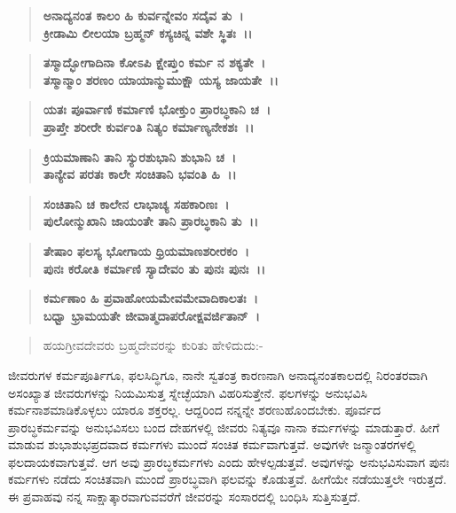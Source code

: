 \begin{verse}
\textbf{ಅನಾದ್ಯನಂತ ಕಾಲಂ ಹಿ ಕುರ್ವನ್ನೇವಂ ಸದೈವ ತು~।}\\\textbf{ಕ್ರೀಡಾಮಿ ಲೀಲಯಾ ಬ್ರಹ್ಮನ್ ಕಸ್ಯಚಿನ್ನ ವಶೇ ಸ್ಥಿತಃ~।।}
\end{verse}

\begin{verse}
\textbf{ತಸ್ಮಾದ್ಭೋಗಾದಿನಾ ಕೋಽಪಿ ಕ್ಷೇಪ್ತುಂ ಕರ್ಮ ನ ಶಕ್ಯತೇ~।}\\\textbf{ತಸ್ಮಾನ್ಮಾಂ ಶರಣಂ ಯಾಯಾನ್ಮುಮುಕ್ಷೌ ಯಸ್ಯ ಜಾಯತೇ~।।}
\end{verse}

\begin{verse}
\textbf{ಯತಃ ಪೂರ್ವಾಣಿ ಕರ್ಮಾಣಿ ಭೋಕ್ತುಂ ಪ್ರಾರಬ್ಧಕಾನಿ ಚ~।}\\\textbf{ಪ್ರಾಪ್ತೇ ಶರೀರೇ ಕುರ್ವಂತಿ ನಿತ್ಯಂ ಕರ್ಮಾಣ್ಯನೇಕಶಃ~।।}
\end{verse}

\begin{verse}
\textbf{ಕ್ರಿಯಮಾಣಾನಿ ತಾನಿ ಸ್ಯುರಶುಭಾನಿ ಶುಭಾನಿ ಚ~।}\\\textbf{ತಾನ್ಯೇವ ಪರತಃ ಕಾಲೇ ಸಂಚಿತಾನಿ ಭವಂತಿ ಹಿ~।।}
\end{verse}

\begin{verse}
\textbf{ಸಂಚಿತಾನಿ ಚ ಕಾಲೇನ ಲಾಭಾಚ್ಯ ಸಹಕಾರಿಣಃ~।}\\\textbf{ಪುಲೋನ್ಮುಖಾನಿ ಜಾಯಂತೇ ತಾನಿ ಪ್ರಾರಬ್ಧಕಾನಿ ತು~।।}
\end{verse}

\begin{verse}
\textbf{ತೇಷಾಂ ಫಲಸ್ಯ ಭೋಗಾಯ ಧ್ರಿಯಮಾಣಶರೀರಕಂ~।}\\\textbf{ಪುನಃ ಕರೋತಿ ಕರ್ಮಾಣಿ ಸ್ಯಾದೇವಂ ತು ಪುನಃ ಪುನಃ~।।}
\end{verse}

\begin{verse}
\textbf{ಕರ್ಮಣಾಂ ಹಿ ಪ್ರವಾಹೋಯಮೇವಮೇವಾದಿಕಾಲತಃ~।}\\\textbf{ಬಧ್ವಾ ಭ್ರಾಮಯತೇ ಜೀವಾತ್ಮದಾಪರೋಕ್ಷವರ್ಜಿತಾನ್~।}
\end{verse}


\newpage

\begin{verse}
ಹಯಗ್ರೀವದೇವರು ಬ್ರಹ್ಮದೇವರನ್ನು ಕುರಿತು ಹೇಳಿದುದು:-
\end{verse}

ಜೀವರುಗಳ ಕರ್ಮಪೂರ್ತಿಗೂ, ಫಲಸಿದ್ಧಿಗೂ, ನಾನೇ ಸ್ವತಂತ್ರ ಕಾರಣನಾಗಿ ಅನಾದ್ಯನಂತಕಾಲದಲ್ಲಿ ನಿರಂತರವಾಗಿ ಅಸಂಖ್ಯಾತ ಜೀವರುಗಳನ್ನು ನಿಯಮಿಸುತ್ತ ಸ್ನೇಚ್ಛೆಯಾಗಿ ವಿಹರಿಸುತ್ತೇನೆ. ಫಲಗಳನ್ನು ಅನುಭವಿಸಿ ಕರ್ಮನಾಶಮಾಡಿಕೊಳ್ಳಲು ಯಾರೂ ಶಕ್ತರಲ್ಲ. ಆದ್ದರಿಂದ ನನ್ನನ್ನೇ ಶರಣುಹೊಂದಬೇಕು. ಪೂರ್ವದ ಪ್ರಾರಬ್ಧಕರ್ಮವನ್ನು ಅನುಭವಿಸಲು ಬಂದ ದೇಹಗಳಲ್ಲಿ ಜೀವರು ನಿತ್ಯವೂ ನಾನಾ ಕರ್ಮಗಳನ್ನು ಮಾಡುತ್ತಾರೆ. ಹೀಗೆ ಮಾಡುವ ಶುಭಾಶುಭಪ್ರದವಾದ ಕರ್ಮಗಳು ಮುಂದೆ ಸಂಚಿತ ಕರ್ಮವಾಗುತ್ತವೆ. ಅವುಗಳೇ ಜನ್ಮಾಂತರಗಳಲ್ಲಿ ಫಲದಾಯಕವಾಗುತ್ತವೆ. ಆಗ ಅವು ಪ್ರಾರಬ್ಧಕರ್ಮಗಳು ಎಂದು ಹೇಳಲ್ಪಡುತ್ತವೆ. ಅವುಗಳನ್ನು ಅನುಭವಿಸುವಾಗ ಪುನಃ ಕರ್ಮಗಳು ನಡೆದು ಸಂಚಿತವಾಗಿ ಮುಂದೆ ಪ್ರಾರಬ್ಧವಾಗಿ ಫಲವನ್ನು ಕೊಡುತ್ತವೆ. ಹೀಗೆಯೇ ನಡೆಯುತ್ತಲೇ ಇರುತ್ತದೆ. ಈ ಪ್ರವಾಹವು ನನ್ನ ಸಾಕ್ಷಾತ್ಕಾರವಾಗುವವರೆಗೆ ಜೀವರನ್ನು ಸಂಸಾರದಲ್ಲಿ ಬಂಧಿಸಿ ಸುತ್ತಿಸುತ್ತದೆ.

